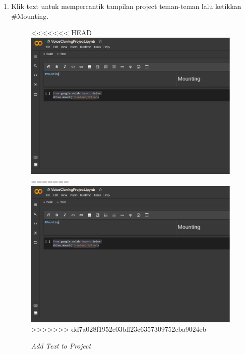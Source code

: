 \begin{enumerate}
\item Klik text untuk mempercantik tampilan project teman-teman lalu ketikkan \#Mounting.
\begin{figure}[H]
    \centering
<<<<<<< HEAD
    \includegraphics[scale=0.3]{figures/colab4}
=======
    \includegraphics[scale=0.4]{figures/colab4}
>>>>>>> dd7a028f1952c03bff23c6357309752cba9024eb
    \caption{\textit{Add Text to Project}}
    \label{colab4}
\end{figure}


\end{enumerate}

